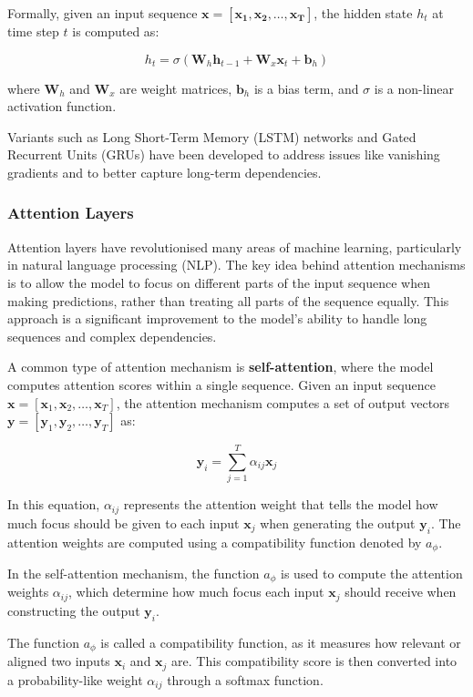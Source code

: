 Formally, given an input sequence \( \bm{x} = [\bm{x_1}, \bm{x_2}, \dots, \bm{x_T}] \), the hidden state \( h_t \) at time step \( t \) is computed as:

\[
    h_t = \sigma \left( \bm{W}_h \bm{h}_{t-1} + \bm{W}_x \bm{x}_t + \bm{b}_h \right)
\]

where \( \bm{W}_h \) and \( \bm{W}_x \) are weight matrices, \( \bm{b}_h \) is a bias term, and \( \sigma \) is a non-linear activation function.


Variants such as Long Short-Term Memory (LSTM) networks and Gated Recurrent Units (GRUs) have been developed to address issues like vanishing gradients and to better capture long-term dependencies.


\subsubsection{Attention Layers}

Attention layers have revolutionised many areas of machine learning, particularly in natural language processing (NLP). The key idea behind attention mechanisms is to allow the model to focus on different parts of the input sequence when making predictions, rather than treating all parts of the sequence equally. This approach is a significant improvement to the model's ability to handle long sequences and complex dependencies.

\bigskip

A common type of attention mechanism is \textbf{self-attention}, where the model computes attention scores within a single sequence. Given an input sequence \( \bm{x} = [\bm{x}_1, \bm{x}_2, \dots, \bm{x}_T] \), the attention mechanism computes a set of output vectors \( \bm{y} = [\bm{y}_1, \bm{y}_2, \dots, \bm{y}_T] \) as:

\[
    \bm{y}_i = \sum_{j=1}^{T} \alpha_{ij} \bm{x}_j
\]

In this equation, \( \alpha_{ij} \) represents the attention weight that tells the model how much focus should be given to each input \( \bm{x}_j \) when generating the output \( \bm{y}_i \). The attention weights are computed using a compatibility function denoted by $a_\phi$.\bigskip

In the self-attention mechanism, the function \( a_\phi \) is used to compute the attention weights \( \alpha_{ij} \), which determine how much focus each input \( \bm{x}_j \) should receive when constructing the output \( \bm{y}_i \). \bigskip

The function \( a_\phi \) is called a compatibility function, as it measures how relevant or aligned two inputs \( \bm{x}_i \) and \( \bm{x}_j \) are. This compatibility score is then converted into a probability-like weight \( \alpha_{ij} \) through a softmax function.\bigskip


